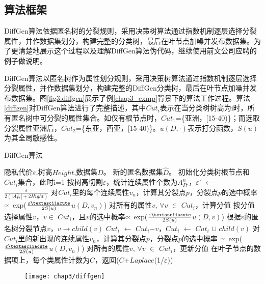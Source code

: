 \subsection{算法框架}

DiffGen算法依据匿名树的分裂规则，采用决策树算法通过指数机制逐层选择分裂属性，并作数据集划分，构建完整的分类树，最后在叶节点加噪并发布数据集。为了更清楚地展示这个过程以及理解DiffGen算法伪代码，继续使用前文公司应聘的例子做说明。

DiffGen算法以匿名树作为属性划分规则，采用决策树算法通过指数机制逐层选择分裂属性，并作数据集划分，构建完整的DiffGen分类树，最后在叶节点加噪并发布数据集。图\ref{fig3:diffgen}展示了例\ref{chap3_exmp}背景下的算法工作过程。算法\ref{diffgen}对DiffGen算法进行了完整描述，其中$Cut_{i}$表示在当分类树树高为i时，所有匿名树中可分裂的属性集合。如仅有根节点时，$Cut_{1}$=\{亚洲，[15-40)\}；而选取分裂属性亚洲后，$Cut_{2}$=\{东亚，西亚，[15-40)\}。$u(D,\cdotp)$表示打分函数，$S(u)$为其全局敏感性。

\begin{algorithm}
	\caption{DiffGen算法} 
	\label{diffgen}
	\begin{algorithmic}[1]
		\REQUIRE 隐私代价$\varepsilon$,树高$Height$,数据集$D$。
		\ENSURE 新的匿名数据集$\hat{D}$。
		\STATE 初始化分类树根节点和$Cut_{i}$集合，此时i=1
		\STATE 按树高切割$\varepsilon$，统计连续属性个数为$A_{Pr}^{n}$，$\varepsilon$' $\leftarrow$ $\frac{\varepsilon}{2(|A_{Pr}^{n}|+2Hight)}$
		\STATE 对$Cut_{i}$里的每个连续属性$v_{n}$，计算其分裂点$p$，分裂点$p$的选中概率 $\wasypropto$ exp($\frac{\varepsilon\textasciiacute}{2S(u)}$$u(D,v_{n})$)
		\STATE 对所有的属性$v$, $\forall$$v$ $\in$ $Cut_{i}$，计算分值
		\STATE 按分值选择属性$v$，$v$$\in$ $Cut_{i}$，且$v$的选中概率$\wasypropto$ exp($\frac{\varepsilon\textasciiacute}{2S(u)}$$u(D,v)$)
		\STATE 根据$v$的匿名树分裂节点$v$，$v$$\rightarrow$$child(v)$
		\STATE $Cut_{i}$ $\leftarrow$ $Cut_{i}$$ - $$v$，$Cut_{i}$ $\leftarrow$ $Cut_{i}$ $\cup$ $child(v)$
		\STATE 对$Cut_{i}$里的新出现的连续属性$v_{n}$，计算其分裂点$p$，分裂点$p$的选中概率 $\wasypropto$ exp($\frac{\varepsilon\textasciiacute}{2S(u)}$$u(D,v_{n})$)
		\STATE 对所有的属性$v$, $\forall$$v$ $\in$ $Cut_{i}$，更新分值
		\ENDFOR
		\RETURN 在叶子节点的数据项上，每个类属性计数为$C$，返回($C$+$\textit{Laplace}$(1/$\varepsilon$))
	\end{algorithmic}
\end{algorithm}


\begin{figure}[!htp]
	\centering
	\texttt{[image: chap3/diffgen]}
\end{figure}

